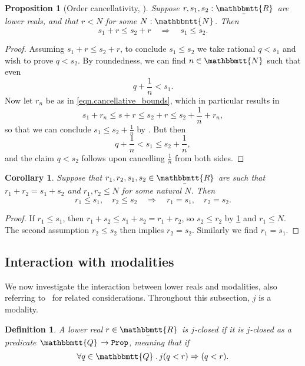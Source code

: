 \documentclass[reqno,11pt]{amsproc}
\theoremstyle{plain}
\newtheorem{proposition}[theorem]{Proposition}
\newtheorem{corollary}[theorem]{Corollary}
\newtheorem{definition}[theorem]{Definition}
\theoremstyle{definition}
\newcommand{\Const}[1]{\mathtt{#1}}
\renewcommand{\to}[1][]{\xrightarrow{#1}}
\newcommand{\ubar}[1]{\underaccent{\bar}{#1}}
\newcommand{\internal}[1]{\raisebox{-.03ex}{$\mathbbmtt{#1}$}}
\newcommand{\hs}{\hspace{1pt}}
\newcommand{\tnn}{\internal{N}\hs}
\newcommand{\tqq}{\internal{Q}\hs}
\newcommand{\trr}{\internal{R}}
\newcommand{\tlrr}{\ubar{\trr}\hs}
\newcommand{\prop}{\Const{Prop}}
\newcommand{\imp}{\Rightarrow}
\numberwithin{equation}{section}
\begin{document}
\begin{proposition}[Order cancellativity, \cite{henry2012simplification}]\label{cor.order_cancel}
	Suppose $r,s_1,s_2:\tlrr$ are lower reals, and that $r<N$ for some $N:\tnn$. Then
	\[
		s_1 + r \le s_2 + r \quad \Longrightarrow \quad s_1 \le s_2.
	\]
\end{proposition}

\begin{proof}
	Assuming $s_1 + r \le s_2 + r$, to conclude $s_1 \le s_2$ we take rational $q < s_1$ and wish to prove $q < s_2$. By roundedness, we can find $n \in \tnn$ such that even
	\[
		q + \frac{1}{n} < s_1.
	\]
	Now let $r_n$ be as in \eqref{eqn.cancellative_bounds}, which in particular results in
	\[
		s_1 + r_n \le s + r \le s_2 + r \le s_2 + \frac{1}{n} + r_n,
	\]
	so that we can conclude $s_1 \le s_2 + \frac{1}{n}$ by . But then
	\[
		q + \frac{1}{n} < s_1 \le s_2 + \frac{1}{n},
	\]
	and the claim $q < s_2$ follows upon cancelling $\frac{1}{n}$ from both sides.
\end{proof}

\begin{corollary}
	\label{cancel_improved_lr}
	Suppose that $r_1, r_2, s_1, s_2 \in \tlrr$ are such that $r_1 + r_2 = s_1 + s_2$ and $r_1, r_2 \le N$ for some natural $N$. Then
	\[
		r_1\le s_1, \quad r_2\le s_2 \quad \Longrightarrow \quad r_1 = s_1, \quad r_2 = s_2.
	\]
\end{corollary}

\begin{proof}
	If $r_1 \le s_1$, then $r_1 + s_2 \le s_1 + s_2 = r_1 + r_2$, so $s_2 \le r_2$ by \cref{cor.order_cancel} and $r_1 \le N$. The second assumption $r_2 \le s_2$ then implies $r_2 = s_2$. Similarly we find $r_1 = s_1$.
\end{proof}

\subsection{Interaction with modalities}

We now investigate the interaction between lower reals and modalities, also referring to~\cite[Section~4.3]{schultz2019temporal} for related considerations. Throughout this subsection, $j$ is a modality.

\begin{definition}
	A lower real $r \in \tlrr$ is \emph{$j$-closed} if it is $j$-closed as a predicate $\tqq \to \prop$, meaning that if
	\[
		\forall q \in \tqq \, . \, j(q < r) \imp (q < r).
	\]
\end{definition}
\end{document}
